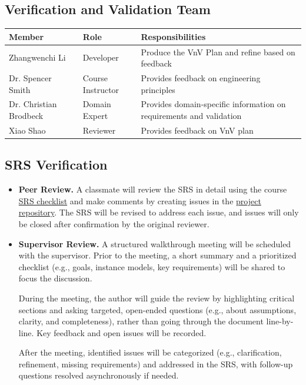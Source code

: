 \documentclass[12pt, titlepage]{article}
\begin{document}
\subsection{Verification and Validation Team}


\begin{tabularx}{\textwidth}{p{3cm}p{2cm}X}
\toprule 
    \textbf{Member} & \textbf{Role} & \textbf{Responsibilities} \\
\midrule
    Zhangwenchi Li & Developer & Produce the VnV Plan and refine based on feedback \\
    Dr. Spencer Smith & Course Instructor & Provides feedback on engineering principles \\
    Dr. Christian Brodbeck & Domain Expert & Provides domain-specific information on requirements and validation \\
    Xiao Shao & Reviewer & Provides feedback on VnV plan \\
\bottomrule
\end{tabularx}




\subsection{SRS Verification}


\begin{itemize}
    \item \textbf{Peer Review.} A classmate will review the SRS in detail using the course \href{https://zhangwenchili.github.io/CAS741-EelbrainPipeline/Checklists/SRS-Checklist.pdf}{SRS checklist} and make comments by creating issues in the \href{https://github.com/zhangwenchili/CAS741-EelbrainPipeline}{project repository}. The SRS will be revised to address each issue, and issues will only be closed after confirmation by the original reviewer.
    \item \textbf{Supervisor Review.} A structured walkthrough meeting will be scheduled with the supervisor. Prior to the meeting, a short summary and a prioritized checklist (e.g., goals, instance models, key requirements) will be shared to focus the discussion.

    During the meeting, the author will guide the review by highlighting critical sections and asking targeted, open-ended questions (e.g., about assumptions, clarity, and completeness), rather than going through the document line-by-line. Key feedback and open issues will be recorded.
    
    After the meeting, identified issues will be categorized (e.g., clarification, refinement, missing requirements) and addressed in the SRS, with follow-up questions resolved asynchronously if needed.
\end{itemize}
\end{document}

